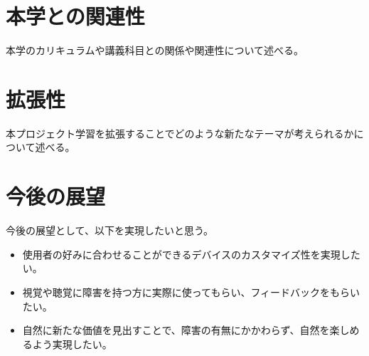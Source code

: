 \section{本学との関連性}
本学のカリキュラムや講義科目との関係や関連性について述べる。

\section{拡張性}
本プロジェクト学習を拡張することでどのような新たなテーマが考えられるかについて述べる。

\section{今後の展望}今後の展望として、以下を実現したいと思う。
\begin{itemize}
  \item 使用者の好みに合わせることができるデバイスのカスタマイズ性を実現したい。
  \item 視覚や聴覚に障害を持つ方に実際に使ってもらい、フィードバックをもらいたい。
  \item 自然に新たな価値を見出すことで、障害の有無にかかわらず、自然を楽しめるよう実現したい。
\end{itemize}  

\newpage\clearpage
\vspace*{-20pt}
\printbibliography[segment=\therefsegment,heading=subbibliography]
